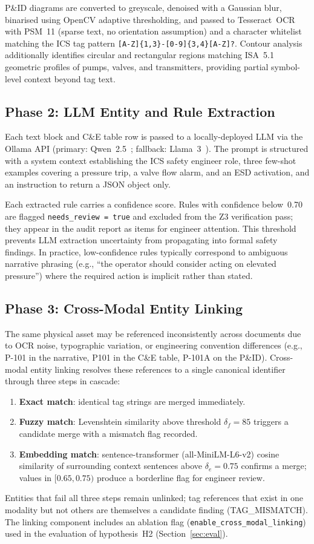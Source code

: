 \documentclass[conference]{IEEEtran}
\begin{document}
P\&ID diagrams are converted to greyscale, denoised with a Gaussian blur,
binarised using OpenCV adaptive thresholding, and passed to Tesseract~OCR
with PSM~11 (sparse text, no orientation assumption) and a character
whitelist matching the ICS tag pattern \texttt{[A-Z]\{1,3\}-[0-9]\{3,4\}[A-Z]?}.
Contour analysis additionally identifies circular and rectangular regions
matching ISA~5.1 geometric profiles of pumps, valves, and transmitters,
providing partial symbol-level context beyond tag text.

\subsection{Phase 2: LLM Entity and Rule Extraction}
Each text block and C\&E table row is passed to a locally-deployed LLM via
the Ollama API (primary: Qwen~2.5~\cite{qwen2024}; fallback:
Llama~3~\cite{llama2024}). The prompt is structured with a system context
establishing the ICS safety engineer role, three few-shot examples covering
a pressure trip, a valve flow alarm, and an ESD activation, and an
instruction to return a JSON object only.

Each extracted rule carries a confidence score. Rules with confidence
below~0.70 are flagged \texttt{needs\_review = true} and excluded from
the Z3 verification pass; they appear in the audit report as items for
engineer attention. This threshold prevents LLM extraction uncertainty
from propagating into formal safety findings. In practice, low-confidence
rules typically correspond to ambiguous narrative phrasing (e.g., ``the
operator should consider acting on elevated pressure'') where the
required action is implicit rather than stated.

\subsection{Phase 3: Cross-Modal Entity Linking}
The same physical asset may be referenced inconsistently across documents
due to OCR noise, typographic variation, or engineering convention
differences (e.g., P-101 in the narrative, P101 in the C\&E table, P-101A
on the P\&ID). Cross-modal entity linking resolves these references to a
single canonical identifier through three steps in cascade:
\begin{enumerate}
\item \textbf{Exact match}: identical tag strings are merged immediately.
\item \textbf{Fuzzy match}: Levenshtein similarity above threshold $\delta_f = 85$
  triggers a candidate merge with a mismatch flag recorded.
\item \textbf{Embedding match}: sentence-transformer (all-MiniLM-L6-v2) cosine
  similarity of surrounding context sentences above $\delta_e = 0.75$ confirms
  a merge; values in $[0.65, 0.75)$ produce a borderline flag for engineer
  review.
\end{enumerate}
Entities that fail all three steps remain unlinked; tag references that
exist in one modality but not others are themselves a candidate finding
(TAG\_MISMATCH). The linking component includes an ablation flag
(\texttt{enable\_cross\_modal\_linking}) used in the evaluation of
hypothesis~H2 (Section~\ref{sec:eval}).
\end{document}
